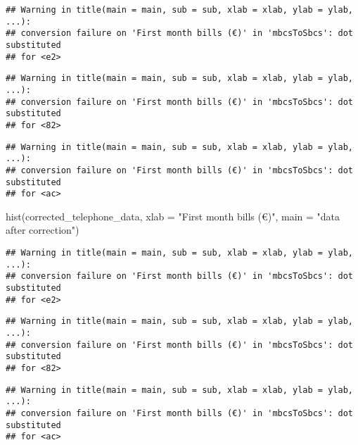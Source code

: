 \documentclass[
]{article}
\newenvironment{Shaded}{\begin{snugshade}}{\end{snugshade}}
\newcommand{\AttributeTok}[1]{\textcolor[rgb]{0.77,0.63,0.00}{#1}}
\newcommand{\FunctionTok}[1]{\textcolor[rgb]{0.00,0.00,0.00}{#1}}
\newcommand{\NormalTok}[1]{#1}
\newcommand{\SpecialCharTok}[1]{\textcolor[rgb]{0.00,0.00,0.00}{#1}}
\newcommand{\StringTok}[1]{\textcolor[rgb]{0.31,0.60,0.02}{#1}}
\begin{document}
\begin{verbatim}
## Warning in title(main = main, sub = sub, xlab = xlab, ylab = ylab, ...):
## conversion failure on 'First month bills (€)' in 'mbcsToSbcs': dot substituted
## for <e2>
\end{verbatim}

\begin{verbatim}
## Warning in title(main = main, sub = sub, xlab = xlab, ylab = ylab, ...):
## conversion failure on 'First month bills (€)' in 'mbcsToSbcs': dot substituted
## for <82>
\end{verbatim}

\begin{verbatim}
## Warning in title(main = main, sub = sub, xlab = xlab, ylab = ylab, ...):
## conversion failure on 'First month bills (€)' in 'mbcsToSbcs': dot substituted
## for <ac>
\end{verbatim}

\begin{Shaded}
\begin{Highlighting}[]
\FunctionTok{hist}\NormalTok{(corrected\_telephone\_data, }\AttributeTok{xlab =} \StringTok{"First month bills (€)"}\NormalTok{, }\AttributeTok{main =} \StringTok{"data after correction"}\NormalTok{)}
\end{Highlighting}
\end{Shaded}

\begin{verbatim}
## Warning in title(main = main, sub = sub, xlab = xlab, ylab = ylab, ...):
## conversion failure on 'First month bills (€)' in 'mbcsToSbcs': dot substituted
## for <e2>
\end{verbatim}

\begin{verbatim}
## Warning in title(main = main, sub = sub, xlab = xlab, ylab = ylab, ...):
## conversion failure on 'First month bills (€)' in 'mbcsToSbcs': dot substituted
## for <82>
\end{verbatim}

\begin{verbatim}
## Warning in title(main = main, sub = sub, xlab = xlab, ylab = ylab, ...):
## conversion failure on 'First month bills (€)' in 'mbcsToSbcs': dot substituted
## for <ac>
\end{verbatim}

\begin{Shaded}
\end{Shaded}
\end{document}

